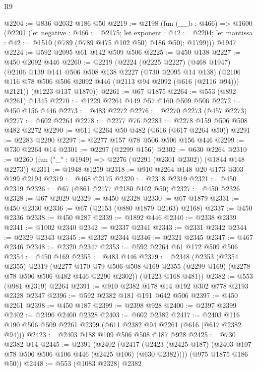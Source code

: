 \begin{lexlean}{R9}
\begin{coremodule}
@2204 := @836 @2032 @186 @50
@2219 := @2198
    (fun (__b : @466) =>
    @1600
      (@2201
        (let negative : @466 := @2175;
        let exponent : @42 := @2204;
        let mantissa : @42 := @1510 (@789 (@789 @475 @102 @50) @186 @50); @1799)))
    @1947
@2224 := @592 @2095 @61 @142 @509 @506
@2225 := @450 @138
@2227 := @450 @2092 @446
@2260 := @2219
    (@2224
      (@2225 @2227)
      (@468 @1947)
      (@2106
        @139
        @141
        @506
        @508
        @138
        @2227
        (@730 @2095 @14 @138)
        (@2106 @116 @78 @506 @506 @2092 @446 (@2113 @94 @2092 (@616 (@2116 @94))) @2121))
      (@1223 @137 @1870))
@2261 := @67 @1875
@2264 := @553 (@892 @2261) @1345
@2270 := @1229 @2264 @149 @57 @160 @509 @506
@2272 := @450 @156 @446
@2273 := @483 @2272
@2276 := @2270 @2273 (@457 @2273)
@2277 := @602 @2264
@2278 := @2277 @76
@2283 := @2278 @159 @506 @508 @482 @2272
@2290 := @611 @2264 @50 @482 (@616 (@617 @2264 @50))
@2291 := @2283 @2290
@2297 := @2277 @157 @78 @506 @506 @156 @446
@2299 := @730 @2264 @14
@2301 := @2297 (@2299 @156)
@2302 := @630 @2264
@2310 := @2260 (fun ("_" : @1949) => @2276 (@2291 (@2301 @2302)) (@1844 @148 @2273))
@2311 := @1948 @1259
@2318 := @910 @2264 @148 @20 @173 @303 @799 @2194
@2319 := @468 @2175
@2320 := @2318 @2319
@2321 := @450 @2319
@2326 := @67 (@861 @2177 @2180 @102 @50)
@2327 := @450 @2326
@2328 := @67 @2029
@2329 := @450 @2328
@2330 := @67 @1879
@2331 := @450 @2330
@2336 := @67 (@2153 (@880 @1879 @2163) @2168)
@2337 := @450 @2336
@2338 := @450 @287
@2339 := @1892 @446
@2340 := @2338 @2339
@2341 := @1002 @2340
@2342 := @2337 @2341
@2343 := @2331 @2342
@2344 := @2329 @2343
@2345 := @2327 @2344
@2346 := @2321 @2345
@2347 := @467 @2346
@2348 := @2320 @2347
@2353 := @592 @2264 @61 @172 @509 @506
@2354 := @450 @169
@2355 := @483 @446
@2379 := @2348
    (@2353
      (@2354 @2355)
      @2319
      (@2277 @170 @79 @506 @508 @169 @2355 (@2299 @169) (@2278 @78 @506 @506 @482 @446 @2290 @2302))
      (@1223 @168 @481))
@2382 := @553 (@981 @2319) @2264
@2391 := @910 @2382 @178 @14 @192 @302 @778 @2193 @2328 @2347
@2396 := @592 @2382 @181 @191 @642 @506
@2397 := @450 @2261
@2398 := @450 @187
@2399 := @2398 @928
@2400 := @2397 @2399
@2402 := @2396 @2400 @2328
@2403 := @602 @2382
@2417 := @2403 @116 @190 @506 @509 @2261 @2399 (@611 @2382 @94 @2261 (@616 (@617 @2382 @94)))
@2423 := @2403 @188 @109 @506 @508 @187 @928
@2425 := @730 @2382 @14
@2445 := @2391
    (@2402
      (@2417 (@2423 (@2425 @187) (@2403 @107 @78 @506 @506 @106 @446 (@2425 @106) (@630 @2382))))
      (@975 @1875 @186 @50))
@2448 := @553 (@1083 @2328) @2382

\end{coremodule}
\end{lexlean}
